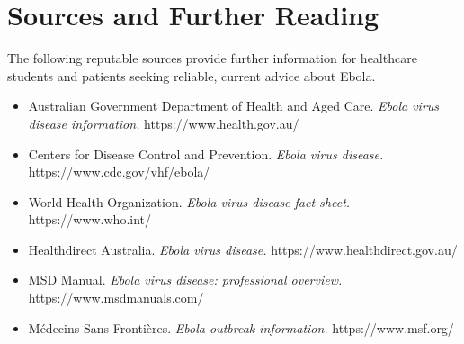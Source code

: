 \section*{Sources and Further Reading}
The following reputable sources provide further information for healthcare students and patients seeking reliable, current advice about Ebola.
\begin{itemize}
    \item Australian Government Department of Health and Aged Care. \textit{Ebola virus disease information.} https://www.health.gov.au/
    \item Centers for Disease Control and Prevention. \textit{Ebola virus disease.} https://www.cdc.gov/vhf/ebola/
    \item World Health Organization. \textit{Ebola virus disease fact sheet.} https://www.who.int/
    \item Healthdirect Australia. \textit{Ebola virus disease.} https://www.healthdirect.gov.au/
    \item MSD Manual. \textit{Ebola virus disease: professional overview.} https://www.msdmanuals.com/
    \item Médecins Sans Frontières. \textit{Ebola outbreak information.} https://www.msf.org/
\end{itemize}
